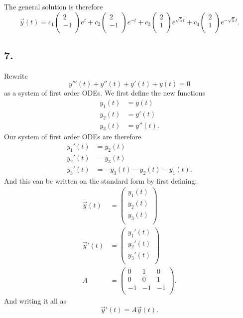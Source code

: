 The general solution is therefore
\[ 
\Vec{y}(t) = c_1 \begin{pmatrix}
2\\
-1\\
\end{pmatrix} e^{t} + c_2 \begin{pmatrix}
2\\
-1\\
\end{pmatrix} e^{-t} + c_3\begin{pmatrix}
2\\
1\\
\end{pmatrix} e^{\sqrt{5}t} + c_4 \begin{pmatrix}
2\\
1\\
\end{pmatrix} e^{-\sqrt{5}t}
.\]



\subsection*{7.} Rewrite
\[ 
y'''(t) + y''(t) + y'(t) + y(t) = 0
\]
as a system of first order ODEs.
\bigbreak
We first define the new functions
\begin{align*}
  y_1(t) &= y(t) \\
  y_2(t) &= y'(t) \\
  y_3(t) &= y''(t)
.\end{align*}
Our system of first order ODEs are therefore
\begin{align*}
  y_1'(t) &= y_2(t) \\
  y_2'(t) &= y_3(t) \\
  y_3'(t) &= - y_3(t) - y_2(t) - y_1(t)
.\end{align*}
And this can be written on the standard form by first defining:
\begin{align*}
  \Vec{y}(t) &= \begin{pmatrix}
  y_1(t)\\
  y_2(t)\\
  y_3(t)\\
  \end{pmatrix} \\
  \Vec{y}'(t) &= \begin{pmatrix}
  y_1'(t)\\
  y_2'(t)\\
  y_3'(t)\\
  \end{pmatrix} \\
    A &= \begin{pmatrix}
    0 & 1 & 0\\
    0 & 0 & 1\\
    -1 & -1 & -1\\
    \end{pmatrix}
.\end{align*}
And writing it all as
\[ 
\Vec{y}'(t) = A\Vec{y}(t)
.\]



